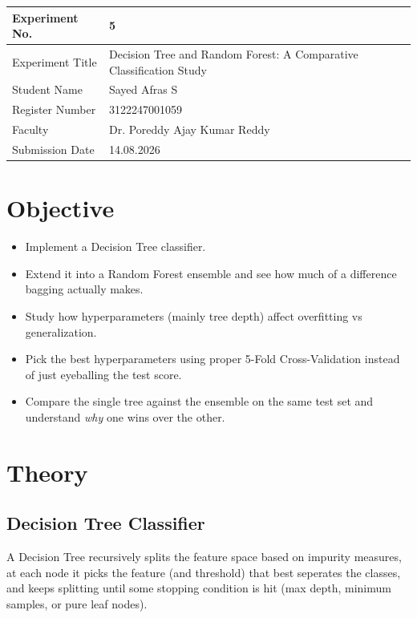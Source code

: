 \documentclass[12pt,a4paper]{article}
\begin{document}
\begin{tabular}{|p{4cm}|p{11cm}|}
\hline
Experiment No. & 5 \\ \hline
Experiment Title & Decision Tree and Random Forest: A Comparative Classification Study \\ \hline
Student Name & Sayed Afras S \\ \hline
Register Number & 3122247001059 \\ \hline
Faculty & Dr. Poreddy Ajay Kumar Reddy \\ \hline
Submission Date & 14.08.2026 \\ \hline
\end{tabular}

\section{Objective}
\begin{itemize}
\item Implement a Decision Tree classifier.
\item Extend it into a Random Forest ensemble and see how much of a difference bagging actually makes.
\item Study how hyperparameters (mainly tree depth) affect overfitting vs generalization.
\item Pick the best hyperparameters using proper 5-Fold Cross-Validation instead of just eyeballing the test score.
\item Compare the single tree against the ensemble on the same test set and understand \textit{why} one wins over the other.
\end{itemize}

\section{Theory}

\subsection*{Decision Tree Classifier}
A Decision Tree recursively splits the feature space based on impurity measures, at each node it picks the feature (and threshold) that best seperates the classes, and keeps splitting until some stopping condition is hit (max depth, minimum samples, or pure leaf nodes).
\end{document}
